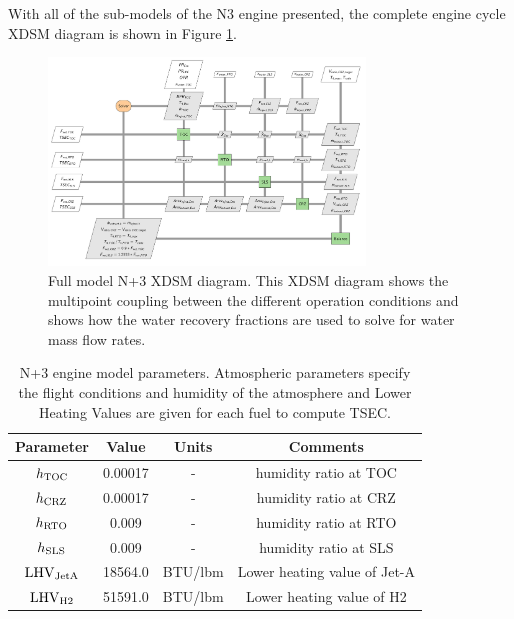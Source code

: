 \documentclass[conf]{new-aiaa}
\begin{document}
With all of the sub-models of the N3 engine presented, the complete engine cycle XDSM diagram is shown in Figure \ref{fig:N3_xdsm_full}.

\begin{figure}[hbt!]
    \centering
    \includegraphics[width=0.75\textwidth]{N3_xdsm_full.pdf}
    \caption{
        Full model N+3 XDSM diagram.
        This XDSM diagram shows the multipoint coupling between the different operation conditions and shows how the water recovery fractions are used to solve for water mass flow rates.
    }
    \label{fig:N3_xdsm_full}
\end{figure}

\begin{table}[hbt!]
    \centering
    \caption{
        N+3 engine model parameters.
        Atmospheric parameters specify the flight conditions and humidity of the atmosphere and Lower Heating Values are given for each fuel to compute TSEC.}
    \begin{tabular}{c c c c}
        \hline
        Parameter              & Value   & Units          & Comments                                        \\
        \hline
        $h_{\rm{TOC}}$         & 0.00017 & -              & humidity ratio at TOC \cite{Kalnay1996}         \\
        $h_{\rm{CRZ}}$         & 0.00017 & -              & humidity ratio at CRZ \cite{Kalnay1996}         \\
        $h_{\rm{RTO}}$         & 0.009   & -              & humidity ratio at RTO \cite{Kalnay1996}         \\
        $h_{\rm{SLS}}$         & 0.009   & -              & humidity ratio at SLS \cite{Kalnay1996}         \\
        $\rm{LHV}_{\rm{JetA}}$ & 18564.0 & \unit{BTU/lbm} & Lower heating value of Jet-A \cite{Lawicki2002} \\
        $\rm{LHV}_{\rm{H2}}$   & 51591.0 & \unit{BTU/lbm} & Lower heating value of H2 \cite{toolbox2003}    \\
        \hline
    \end{tabular}
    \label{engine_params}
\end{table}
\end{document}
